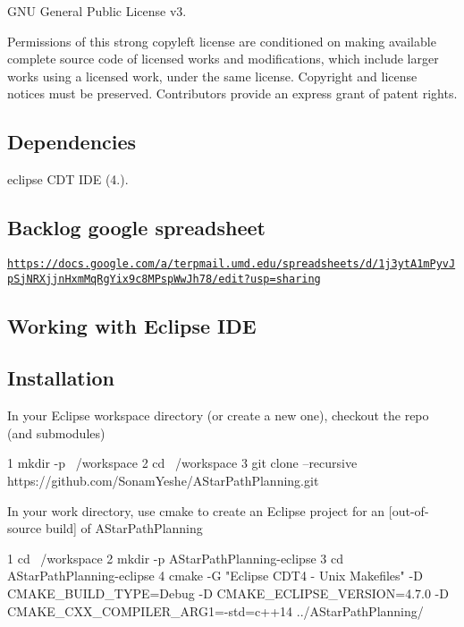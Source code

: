 G\+NU General Public License v3.

Permissions of this strong copyleft license are conditioned on making available complete source code of licensed works and modifications, which include larger works using a licensed work, under the same license. Copyright and license notices must be preserved. Contributors provide an express grant of patent rights.

\subsection*{Dependencies}


\begin{DoxyEnumerate}
\item eclipse C\+DT I\+DE (4.).
\end{DoxyEnumerate}

\subsection*{Backlog google spreadsheet}

\href{https://docs.google.com/a/terpmail.umd.edu/spreadsheets/d/1j3ytA1mPyvJpSjNRXjjnHxmMqRgYix9c8MPspWwJh78/edit?usp=sharing}{\tt https\+://docs.\+google.\+com/a/terpmail.\+umd.\+edu/spreadsheets/d/1j3yt\+A1m\+Pyv\+Jp\+Sj\+N\+R\+Xjjn\+Hxm\+Mq\+Rg\+Yix9c8\+M\+Psp\+Ww\+Jh78/edit?usp=sharing}

\subsection*{Working with Eclipse I\+DE}

\subsection*{Installation}

In your Eclipse workspace directory (or create a new one), checkout the repo (and submodules) 
\begin{DoxyCode}
1 mkdir -p ~/workspace
2 cd ~/workspace
3 git clone --recursive https://github.com/SonamYeshe/AStarPathPlanning.git
\end{DoxyCode}


In your work directory, use cmake to create an Eclipse project for an \mbox{[}out-\/of-\/source build\mbox{]} of A\+Star\+Path\+Planning


\begin{DoxyCode}
1 cd ~/workspace
2 mkdir -p AStarPathPlanning-eclipse
3 cd AStarPathPlanning-eclipse
4 cmake -G "Eclipse CDT4 - Unix Makefiles" -D CMAKE\_BUILD\_TYPE=Debug -D CMAKE\_ECLIPSE\_VERSION=4.7.0 -D
       CMAKE\_CXX\_COMPILER\_ARG1=-std=c++14 ../AStarPathPlanning/
\end{DoxyCode}


